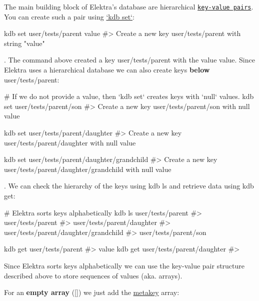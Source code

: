 The main building block of Elektra’s database are hierarchical \href{https://en.wikipedia.org/wiki/Key-value_database}{\tt key-\/value pairs}. You can create such a pair using \hyperlink{doc_help_kdb-set_md}{`kdb set`}\+:


\begin{DoxyCode}
kdb set user/tests/parent value
#> Create a new key user/tests/parent with string "value"
\end{DoxyCode}


. The command above created a key {\ttfamily user/tests/parent} with the value {\ttfamily value}. Since Elektra uses a hierarchical database we can also create keys {\bfseries below} {\ttfamily user/tests/parent}\+:


\begin{DoxyCode}
# If we do not provide a value, then `kdb set` creates keys with `null` values.
kdb set user/tests/parent/son
#> Create a new key user/tests/parent/son with null value

kdb set user/tests/parent/daughter
#> Create a new key user/tests/parent/daughter with null value

kdb set user/tests/parent/daughter/grandchild
#> Create a new key user/tests/parent/daughter/grandchild with null value
\end{DoxyCode}


. We can check the hierarchy of the keys using {\ttfamily kdb ls} and retrieve data using {\ttfamily kdb get}\+:


\begin{DoxyCode}
# Elektra sorts keys alphabetically
kdb ls user/tests/parent
#> user/tests/parent
#> user/tests/parent/daughter
#> user/tests/parent/daughter/grandchild
#> user/tests/parent/son

kdb get user/tests/parent
#> value
kdb get user/tests/parent/daughter
#>
\end{DoxyCode}


Since Elektra sorts keys alphabetically we can use the key-\/value pair structure described above to store sequences of values (aka. arrays).

For an {\bfseries empty array} ({\ttfamily \mbox{[}\mbox{]}}) we just add the \hyperlink{doc_help_elektra-metadata_md}{metakey} {\ttfamily array}\+:

